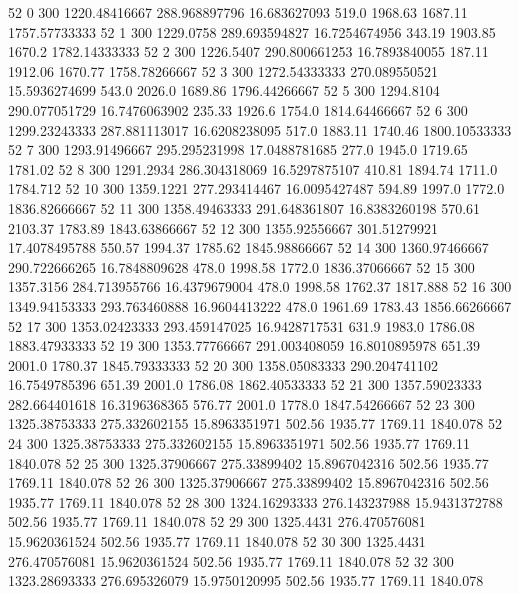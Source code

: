 52  0  300  1220.48416667  288.968897796  16.683627093  519.0  1968.63  1687.11  1757.57733333 
52  1  300  1229.0758  289.693594827  16.7254674956  343.19  1903.85  1670.2  1782.14333333 
52  2  300  1226.5407  290.800661253  16.7893840055  187.11  1912.06  1670.77  1758.78266667 
52  3  300  1272.54333333  270.089550521  15.5936274699  543.0  2026.0  1689.86  1796.44266667 
52  5  300  1294.8104  290.077051729  16.7476063902  235.33  1926.6  1754.0  1814.64466667 
52  6  300  1299.23243333  287.881113017  16.6208238095  517.0  1883.11  1740.46  1800.10533333 
52  7  300  1293.91496667  295.295231998  17.0488781685  277.0  1945.0  1719.65  1781.02 
52  8  300  1291.2934  286.304318069  16.5297875107  410.81  1894.74  1711.0  1784.712 
52  10  300  1359.1221  277.293414467  16.0095427487  594.89  1997.0  1772.0  1836.82666667 
52  11  300  1358.49463333  291.648361807  16.8383260198  570.61  2103.37  1783.89  1843.63866667 
52  12  300  1355.92556667  301.51279921  17.4078495788  550.57  1994.37  1785.62  1845.98866667 
52  14  300  1360.97466667  290.722666265  16.7848809628  478.0  1998.58  1772.0  1836.37066667 
52  15  300  1357.3156  284.713955766  16.4379679004  478.0  1998.58  1762.37  1817.888 
52  16  300  1349.94153333  293.763460888  16.9604413222  478.0  1961.69  1783.43  1856.66266667 
52  17  300  1353.02423333  293.459147025  16.9428717531  631.9  1983.0  1786.08  1883.47933333 
52  19  300  1353.77766667  291.003408059  16.8010895978  651.39  2001.0  1780.37  1845.79333333 
52  20  300  1358.05083333  290.204741102  16.7549785396  651.39  2001.0  1786.08  1862.40533333 
52  21  300  1357.59023333  282.664401618  16.3196368365  576.77  2001.0  1778.0  1847.54266667 
52  23  300  1325.38753333  275.332602155  15.8963351971  502.56  1935.77  1769.11  1840.078 
52  24  300  1325.38753333  275.332602155  15.8963351971  502.56  1935.77  1769.11  1840.078 
52  25  300  1325.37906667  275.33899402  15.8967042316  502.56  1935.77  1769.11  1840.078 
52  26  300  1325.37906667  275.33899402  15.8967042316  502.56  1935.77  1769.11  1840.078 
52  28  300  1324.16293333  276.143237988  15.9431372788  502.56  1935.77  1769.11  1840.078 
52  29  300  1325.4431  276.470576081  15.9620361524  502.56  1935.77  1769.11  1840.078 
52  30  300  1325.4431  276.470576081  15.9620361524  502.56  1935.77  1769.11  1840.078 
52  32  300  1323.28693333  276.695326079  15.9750120995  502.56  1935.77  1769.11  1840.078 

